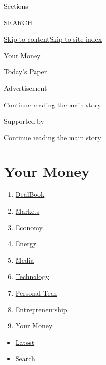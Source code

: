 Sections

SEARCH

\protect\hyperlink{site-content}{Skip to
content}\protect\hyperlink{site-index}{Skip to site index}

\href{https://www.nytimes3xbfgragh.onion/section/your-money}{Your Money}

\href{https://myaccount.nytimes3xbfgragh.onion/auth/login?response_type=cookie\&client_id=vi}{}

\href{https://www.nytimes3xbfgragh.onion/section/todayspaper}{Today's
Paper}

Advertisement

\protect\hyperlink{after-top}{Continue reading the main story}

Supported by

\protect\hyperlink{after-sponsor}{Continue reading the main story}

\hypertarget{your-money}{%
\section{Your Money}\label{your-money}}

\begin{enumerate}
\def\labelenumi{\arabic{enumi}.}
\tightlist
\item
  \href{/pages/business/dealbook/index.html}{DealBook}
\item
  \href{https://markets.on.nytimes3xbfgragh.onion}{Markets}
\item
  \href{/section/business/economy}{Economy}
\item
  \href{/section/business/energy-environment}{Energy}
\item
  \href{/section/business/media}{Media}
\item
  \href{/section/technology}{Technology}
\item
  \href{/section/technology/personaltech}{Personal Tech}
\item
  \href{/section/business/smallbusiness}{Entrepreneurship}
\item
  \href{/section/your-money}{Your Money}
\end{enumerate}

\begin{itemize}
\tightlist
\item
  \protect\hyperlink{stream-panel}{Latest}
\item
  Search
\end{itemize}

